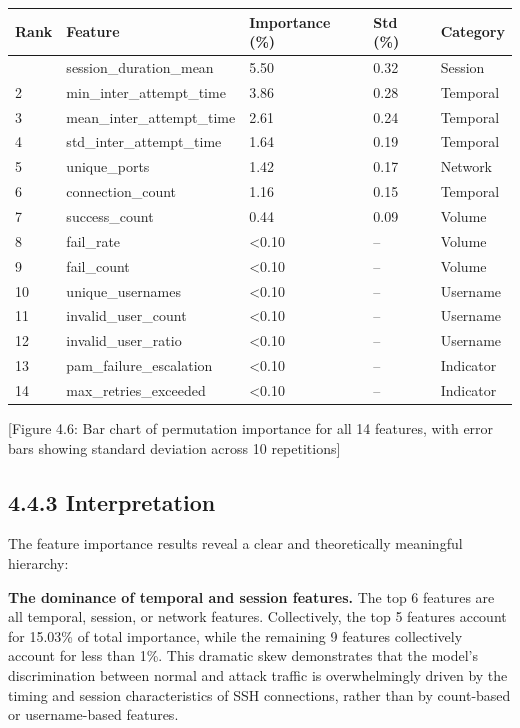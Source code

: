 \documentclass[
  a4paper]{report}
\newcounter{none} %
\begin{document}
{\def\LTcaptype{none} %
\begin{longtable}[]{@{}lllll@{}}
\toprule\noalign{}
Rank & Feature & Importance (\%) & Std (\%) & Category \\
\midrule\noalign{}
\endhead
\bottomrule\noalign{}
\endlastfoot
1 & session\_duration\_mean & 5.50 & 0.32 & Session \\
2 & min\_inter\_attempt\_time & 3.86 & 0.28 & Temporal \\
3 & mean\_inter\_attempt\_time & 2.61 & 0.24 & Temporal \\
4 & std\_inter\_attempt\_time & 1.64 & 0.19 & Temporal \\
5 & unique\_ports & 1.42 & 0.17 & Network \\
6 & connection\_count & 1.16 & 0.15 & Temporal \\
7 & success\_count & 0.44 & 0.09 & Volume \\
8 & fail\_rate & \textless0.10 & -- & Volume \\
9 & fail\_count & \textless0.10 & -- & Volume \\
10 & unique\_usernames & \textless0.10 & -- & Username \\
11 & invalid\_user\_count & \textless0.10 & -- & Username \\
12 & invalid\_user\_ratio & \textless0.10 & -- & Username \\
13 & pam\_failure\_escalation & \textless0.10 & -- & Indicator \\
14 & max\_retries\_exceeded & \textless0.10 & -- & Indicator \\
\end{longtable}
}

{[}Figure 4.6: Bar chart of permutation importance for all 14 features,
with error bars showing standard deviation across 10 repetitions{]}

\subsection{4.4.3 Interpretation}\label{interpretation}

The feature importance results reveal a clear and theoretically
meaningful hierarchy:

\textbf{The dominance of temporal and session features.} The top 6
features are all temporal, session, or network features. Collectively,
the top 5 features account for 15.03\% of total importance, while the
remaining 9 features collectively account for less than 1\%. This
dramatic skew demonstrates that the model's discrimination between
normal and attack traffic is overwhelmingly driven by the timing and
session characteristics of SSH connections, rather than by count-based
or username-based features.
\end{document}
